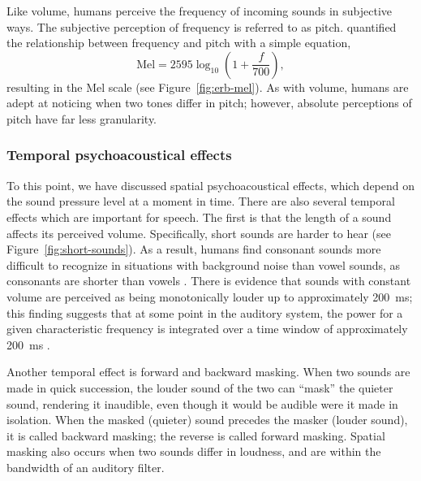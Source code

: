 Like volume,
humans perceive
the frequency of incoming sounds
in subjective ways.
The subjective perception of frequency
is referred to as pitch.
\citet{stevens1937} quantified
the relationship between
frequency and pitch
with a simple equation,
\begin{equation*}
  \text{Mel} = 2595 \log_{10} \left(1 + \frac{f}{700}\right),
\end{equation*}
resulting in the Mel scale
(see Figure~\ref{fig:erb-mel}).
As with volume, humans are adept at
noticing when two tones differ in pitch;
however, absolute perceptions of pitch
have far less granularity.

\subsubsection{Temporal psychoacoustical effects}

To this point, we have discussed
spatial psychoacoustical effects,
which depend on
the sound pressure level
at a moment in time.
There are also several temporal effects
which are important for speech.
The first is that the length
of a sound affects its perceived volume.
Specifically, short sounds are harder to hear
(see Figure~\ref{fig:short-sounds}).
As a result, humans find
consonant sounds more difficult
to recognize in situations with background noise
than vowel sounds,
as consonants are shorter than vowels
\citep[Chapter~3]{everest2001}.
There is evidence that sounds with constant volume
are perceived as being monotonically louder
up to approximately 200~ms;
this finding suggests that
at some point in the auditory system,
the power for a given characteristic frequency
is integrated over a time window
of approximately 200~ms
\citep[p.64]{kollmeier2008}.


Another temporal effect is forward and backward masking.
When two sounds are made in quick succession,
the louder sound of the two can
``mask'' the quieter sound,
rendering it inaudible,
even though it would be audible
were it made in isolation.
When the masked (quieter) sound
precedes the masker (louder sound),
it is called backward masking;
the reverse is called forward masking.
Spatial masking also occurs
when two sounds differ in loudness,
and are within the bandwidth
of an auditory filter.

